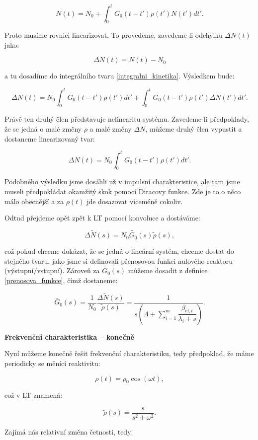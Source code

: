 $$ N(t) = N_0 + \int_0^t G_0(t-t') \rho(t') N(t')dt'. $$

Proto musíme rovnici linearizovat. To provedeme, zavedeme-li odchylku $\Delta N(t)$ jako:

$$ \Delta N(t) = N(t) - N_0 $$

a tu dosadíme do integrálního tvaru \eqref{integralni_kinetika}. Výsledkem bude:

$$ \Delta N(t) = N_0 \int_0^t G_0(t-t') \rho(t') dt' + \int_0^t G_0(t-t') \rho(t') \Delta N(t')dt'. $$

Právě ten druhý člen představuje nelinearitu systému. Zavedeme-li předpoklady, že se jedná o malé změny $\rho$ a malé změny $\Delta N$, můžeme druhý člen vypustit a dostaneme linearizovaný tvar:

\begin{equation}
  \boxed{
  \Delta N(t) = N_0 \int_0^t G_0(t-t') \rho(t') dt'.
  \label{linearizovana_kinetika}}
\end{equation}

Podobného výsledku jsme dosáhli už v impulsní charakteristice, ale tam jsme museli předpokládat okamžitý skok pomocí Diracovy funkce. Zde je to o něco málo obecnější a za $\rho(t)$ jde dosazovat víceméně cokoliv.

Odtud přejdeme opět zpět k LT pomocí konvoluce a dostáváme:

$$ \Delta \tilde{N}(s) = N_0 \tilde{G_0}(s) \tilde{\rho} (s), $$

což pokud chceme dokázat, že se jedná o lineární systém, chceme dostat do stejného tvaru, jako jsme si definovali přenosovou funkci nulového reaktoru (výstupní/vstupní). Zároveň za $\tilde{G_0}(s)$ můžeme dosadit z definice \eqref{prenosova_funkce}, čímž dostaneme:

$$ \tilde{G_0}(s) = \dfrac{1}{N_0} \dfrac{\Delta \tilde{N}(s)} {\tilde{\rho}(s)} = \dfrac{1}{s \left ( \Lambda + \sum_{i=1}^m \dfrac{\beta_{\text{ef},i}}{\lambda_i + s} \right )}.$$

\textbf{Frekvenční charakteristika -- konečně}

Nyní můžeme konečně řešit frekvenční charakteristiku, tedy předpoklad, že máme periodicky se měnící reaktivitu:

$$ \rho(t) = \rho_0 \cos (\omega t), $$

což v LT znamená:

$$ \tilde{\rho}(s) = \dfrac{s}{s^2 + \omega^2}. $$

Zajímá nás relativní změna četnosti, tedy:

